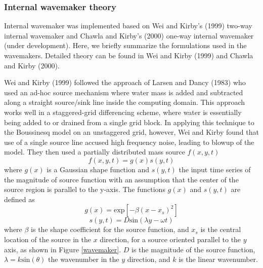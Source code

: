 \documentclass[11pt]{article}
\newcommand{\be}{\begin{equation}}
\newcommand{\ee}{\end{equation}}
\begin{document}
\subsubsection{Internal wavemaker theory}

Internal wavemaker was implemented based on Wei and Kirby's (1999) two-way internal wavemaker and Chawla and Kirby's (2000) one-way internal wavemaker (under development). Here, we briefly summarize the formulations used in the wavemakers. Detailed theory can be found in Wei and Kirby (1999) and Chawla and Kirby (2000).    

Wei and Kirby (1999) followed the approach of Larsen and Dancy (1983) who used an ad-hoc source mechanism where water mass is added and subtracted along a straight source/sink line inside the computing domain. This approach works well in a staggered-grid differencing scheme, where water is essentially being added to or drained from a single grid block. In applying this technique to the Boussinesq model on an unstaggered grid, however, Wei and Kirby found that use of a single source line accused high frequency noise, leading to blowup of the model. They then used a partially distributed mass source $f(x,y,t)$
\be
f(x,y,t) = g(x) s(y,t)
\ee
where $g(x)$ is a Gaussian shape function and $s(y,t)$ the input time series of the magnitude of source function with an assumption that the center of the source region is parallel to the y-axis. The functions $g(x)$ and $s(y,t)$ are defined as
\be
g(x) = \mbox{exp}[-\beta(x-x_s)^2]
\ee
\be
s(y,t) = D \mbox{sin} (\lambda y -\omega t)
\label{Ssource}
\ee
where $\beta$ is the shape coefficient for the source function, and $x_s$ is the central location of the source in the $x$ direction, for a source oriented parallel to the $y$ axis, as shown in Figure \ref{wavemaker}.  $D$ is the magnitude of the source function, $\lambda = k \mbox{sin} (\theta)$ the wavenumber in the $y$ direction, and $k$ is the linear wavenumber. 
\end{document}
